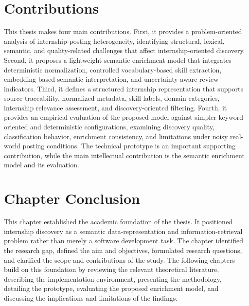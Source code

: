\section{Contributions}
This thesis makes four main contributions.
First, it provides a problem-oriented analysis of internship-posting heterogeneity, identifying
structural, lexical, semantic, and quality-related challenges that affect internship-oriented
discovery.
Second, it proposes a lightweight semantic enrichment model that integrates deterministic
normalization, controlled vocabulary-based skill extraction, embedding-based semantic
interpretation, and uncertainty-aware review indicators.
Third, it defines a structured internship representation that supports source traceability,
normalized metadata, skill labels, domain categories, internship relevance assessment, and
discovery-oriented filtering.
Fourth, it provides an empirical evaluation of the proposed model against simpler keyword-oriented and deterministic configurations, examining discovery quality, classification behavior,
enrichment consistency, and limitations under noisy real-world posting conditions.
The technical prototype is an important supporting contribution, while the main intellectual contribution is the semantic enrichment model and its evaluation.

\section{Chapter Conclusion}
This chapter established the academic foundation of the thesis. It positioned internship discovery
as a semantic data-representation and information-retrieval problem rather than merely a
software development task. The chapter identified the research gap, defined the aim and
objectives, formulated research questions, and clarified the scope and contributions of the study.
The following chapters build on this foundation by reviewing the relevant theoretical literature,
describing the implementation environment, presenting the methodology, detailing the prototype,
evaluating the proposed enrichment model, and discussing the implications and limitations of the
findings.
